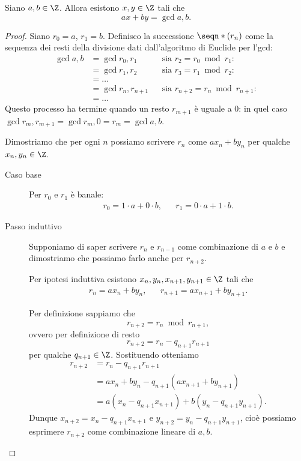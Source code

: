 \begin{theorem}
     \label{bezout}
    Siano $a, b \in \Z$. Allora esistono $x, y \in \Z$ tali che
    \begin{equation}
        ax + by = \gcd{a, b}.
    \end{equation}
\end{theorem}
\begin{proof}
    Siano $r_0 = a$, $r_1 = b$. Definisco la successione $\seqn*(r_n)$ come la sequenza dei resti della divisione dati dall'algoritmo di Euclide per l'gcd:\begin{align*}
        \gcd{a, b} &= \gcd{r_0, r_1} &&\text{sia } r_2 = r_0 \bmod{r_1}: \\
        &= \gcd{r_1, r_2} &&\text{sia } r_3 = r_1 \bmod{r_2}: \\
        &= \dots\\
        &= \gcd{r_n, r_{n+1}} &&\text{sia } r_{n+2} = r_n \bmod{r_{n+1}}:\\
        &= \dots
    \end{align*}
    Questo processo ha termine quando un resto $r_{m+1}$ è uguale a $0$: in quel caso $\gcd{r_m, r_{m+1}} = \gcd{r_m, 0}= r_m = \gcd{a, b}$.

    Dimostriamo che per ogni $n$ possiamo scrivere $r_n$ come $ax_n + by_n$ per qualche $x_n, y_n \in \Z$.
    \begin{description}
        \item[Caso base] Per $r_0$ e $r_1$ è banale: \begin{align*}
            r_0 = 1\cdot a + 0 \cdot b, &&r_1 = 0 \cdot a + 1 \cdot b.
        \end{align*}
        \item[Passo induttivo] Supponiamo di saper scrivere $r_n$ e $r_{n-1}$ come combinazione di $a$ e $b$ e dimostriamo che possiamo farlo anche per $r_{n+2}$.
               
        Per ipotesi induttiva esistono $x_n, y_n, x_{n+1}, y_{n+1} \in \Z$ tali che \begin{align*}
            r_n = ax_n + by_n, && r_{n+1} = ax_{n+1} + by_{n+1}.
        \end{align*}

        Per definizione sappiamo che \[
            r_{n+2} = r_n \bmod{r_{n+1}}, 
        \] ovvero per definizione di resto \[
            r_{n+2} = r_n - q_{n+1}r_{n+1}
        \] per qualche $q_{n+1} \in \Z$. Sostituendo otteniamo \begin{align*}
            r_{n+2} &= r_n - q_{n+1}r_{n+1}\\
            &= ax_n + by_n - q_{n+1}(ax_{n+1} + by_{n+1})\\
            &= a(x_n - q_{n+1}x_{n+1}) + b(y_n - q_{n+1}y_{n+1}).
        \end{align*}
        Dunque $x_{n+2} = x_n - q_{n+1}x_{n+1}$ e $y_{n+2} = y_n - q_{n+1}y_{n+1}$, cioè possiamo esprimere $r_{n+2}$ come combinazione lineare di $a, b$.
    \end{description}


\end{proof}
